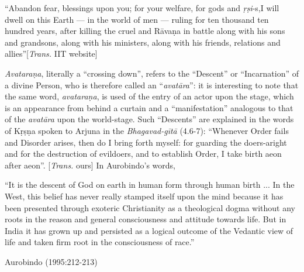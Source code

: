\newpage

\begin{myquote}
“Abandon fear, blessings upon you; for your welfare, for gods and {\sl ṛṣi}-s,\break I will dwell on this Earth --- in the world of men --- ruling for ten thousand ten hundred years, after killing the cruel and Rāvaṇa in battle along with his sons and grandsons, along with his ministers, along with his friends, relations and allies”\hfill [{\sl Trans.} IIT website]
\end{myquote}

{\sl Avataraṇa}, literally a “crossing down”, refers to the “Descent” or “Incarnation” of a divine Person, who is therefore called an “{\sl avatāra}”: it is interesting to note that the same word, {\sl avataraṇa}, is used of the entry of an actor upon the stage, which is an appearance from behind a curtain and a “manifestation” analogous to that of the {\sl avatāra} upon the world-stage. Such “Descents” are explained in the words of Kṛṣṇa spoken to Arjuna in the {\sl Bhagavad-gītā} (4.6-7): “Whenever Order fails and Disorder arises, then do I bring forth myself: for guarding the doers-aright and for the destruction of evildoers, and to establish Order, I take birth aeon after aeon”. [{\sl Trans.} ours] In Aurobindo’s words,  

\begin{myquote}
“It is the descent of God on earth in human form through human birth ... In the West, this belief has never really stamped itself upon the mind because it has been presented through exoteric Christianity as a theological dogma without any roots in the reason and general consciousness and attitude towards life. But in India it has grown up and persisted as a logical outcome of the Vedantic view of life and taken firm root in the consciousness of race.”	

\hfill Aurobindo (1995:212-213)
\end{myquote}

